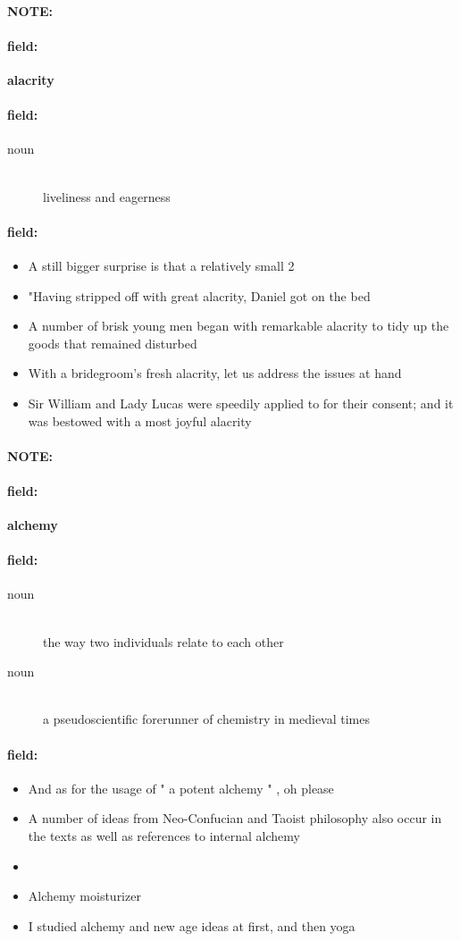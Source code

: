 \documentclass[12pt]{article}
\newenvironment{note}{\paragraph{NOTE:}}{}
\newenvironment{field}{\paragraph{field:}}{}
\begin{document}
\begin{note}
\begin{field}
\textbf{\large alacrity}
\end{field}


\begin{field}
\begin{description}
\item[noun] \hfill \\ 
liveliness and eagerness

\end{description}
\end{field}

\begin{field}
\begin{itemize}
\item A still bigger surprise is that a relatively small 2
\item "Having stripped off with great alacrity, Daniel got on the bed
\item A number of brisk young men began with remarkable alacrity to tidy up the goods that remained disturbed
\item With a bridegroom's fresh alacrity, let us address the issues at hand
\item Sir William and Lady Lucas were speedily applied to for their consent; and it was bestowed with a most joyful alacrity
\end{itemize}
\end{field}
\end{note}
\begin{note}
\begin{field}
\textbf{\large alchemy}
\end{field}


\begin{field}
\begin{description}
\item[noun] \hfill \\ 
the way two individuals relate to each other

\item[noun] \hfill \\ 
a pseudoscientific forerunner of chemistry in medieval times

\end{description}
\end{field}

\begin{field}
\begin{itemize}
\item And as for the usage of " a potent alchemy " , oh please
\item A number of ideas from Neo-Confucian and Taoist philosophy also occur in the texts as well as references to internal alchemy
\item  
\item Alchemy moisturizer
\item I studied alchemy and new age ideas at first, and then yoga
\end{itemize}
\end{field}
\end{note}
\end{document}
